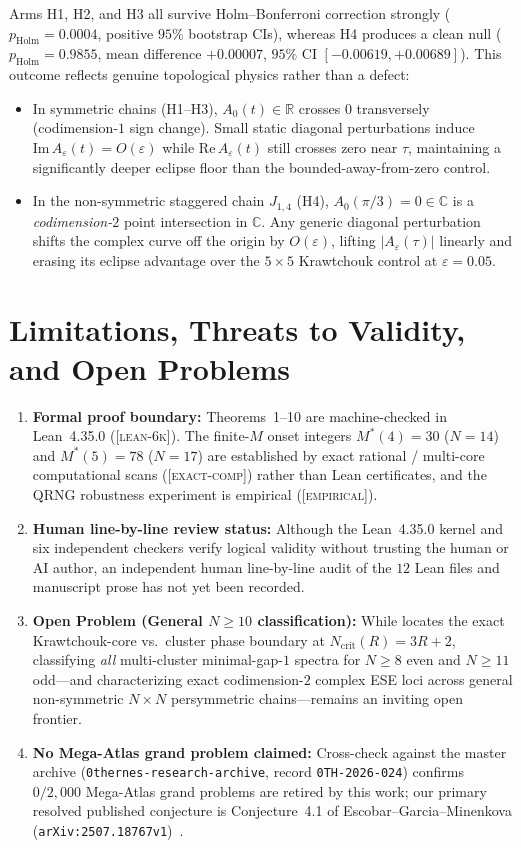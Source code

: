 \documentclass[11pt,reqno]{amsart}
\theoremstyle{definition}
\newcommand{\R}{\mathbb{R}}
\newcommand{\C}{\mathbb{C}}
\newcommand{\taglean}{\textsc{[lean-6k]}}
\newcommand{\tagexact}{\textsc{[exact-comp]}}
\newcommand{\tagemp}{\textsc{[empirical]}}
\newcommand{\id}[1]{\textnormal{\texttt{\small #1}}}
\begin{document}
Arms H1, H2, and H3 all survive Holm--Bonferroni correction strongly ($p_{\mathrm{Holm}}=0.0004$, positive $95\%$ bootstrap CIs), whereas H4 produces a clean null ($p_{\mathrm{Holm}}=0.9855$, mean difference $+0.00007$, $95\%$ CI $[-0.00619,+0.00689]$). This outcome reflects genuine topological physics rather than a defect:
\begin{itemize}
\item In symmetric chains (H1--H3), $A_0(t)\in\R$ crosses $0$ transversely (codimension-$1$ sign change). Small static diagonal perturbations induce $\mathrm{Im}\,A_\varepsilon(t)=O(\varepsilon)$ while $\mathrm{Re}\,A_\varepsilon(t)$ still crosses zero near $\tau$, maintaining a significantly deeper eclipse floor than the bounded-away-from-zero control.
\item In the non-symmetric staggered chain $J_{1,4}$ (H4), $A_0(\pi/3)=0\in\C$ is a \emph{codimension-$2$} point intersection in $\C$. Any generic diagonal perturbation shifts the complex curve off the origin by $O(\varepsilon)$, lifting $|A_\varepsilon(\tau)|$ linearly and erasing its eclipse advantage over the $5\times 5$ Krawtchouk control at $\varepsilon=0.05$.
\end{itemize}

\section{Limitations, Threats to Validity, and Open Problems}
\label{sec:limitations}

\begin{enumerate}
\item \textbf{Formal proof boundary:} Theorems~1--10 are machine-checked in Lean~4.35.0 (\taglean{}). The finite-$M$ onset integers $M^*(4)=30$ ($N=14$) and $M^*(5)=78$ ($N=17$) are established by exact rational / multi-core computational scans (\tagexact{}) rather than Lean certificates, and the QRNG robustness experiment is empirical (\tagemp{}).
\item \textbf{Human line-by-line review status:} Although the Lean~4.35.0 kernel and six independent checkers verify logical validity without trusting the human or AI author, an independent human line-by-line audit of the $12$ Lean files and manuscript prose has not yet been recorded.
\item \textbf{Open Problem (General $N\ge 10$ classification):} While  locates the exact Krawtchouk-core vs.\ cluster phase boundary at $N_{\mathrm{crit}}(R)=3R+2$, classifying \emph{all} multi-cluster minimal-gap-$1$ spectra for $N\ge 8$ even and $N\ge 11$ odd---and characterizing exact codimension-$2$ complex ESE loci across general non-symmetric $N\times N$ persymmetric chains---remains an inviting open frontier.
\item \textbf{No Mega-Atlas grand problem claimed:} Cross-check against the master archive (\id{0thernes-research-archive}, record \id{0TH-2026-024}) confirms $0/2{,}000$ Mega-Atlas grand problems are retired by this work; our primary resolved published conjecture is Conjecture~4.1 of Escobar--Garcia--Minenkova (\texttt{arXiv:2507.18767v1})~\cite{escobar2025}.
\end{enumerate}
\end{document}
